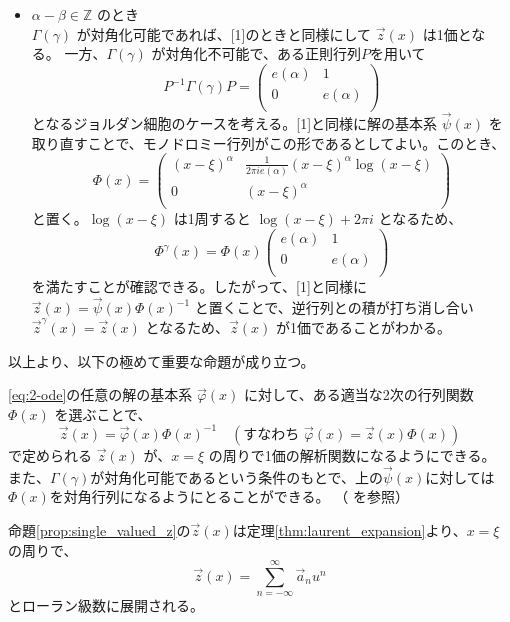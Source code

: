 \begin{itemize}
    \item[\textbf{[2]}] $\alpha-\beta \in \mathbb{Z}$ のとき\\
    $\Gamma(\gamma)$ が対角化可能であれば、[1]のときと同様にして $\vec{z}(x)$ は1価となる。
    一方、$\Gamma(\gamma)$ が対角化不可能で、ある正則行列$P$を用いて
    \[
    P^{-1}\Gamma(\gamma)P=
    \begin{pmatrix}
        e(\alpha) & 1 \\
        0 & e(\alpha) \\
    \end{pmatrix}
    \]
    となるジョルダン細胞のケースを考える。[1]と同様に解の基本系 $\vec{\psi}(x)$ を取り直すことで、モノドロミー行列がこの形であるとしてよい。このとき、
    \[
    \Phi(x)=
    \begin{pmatrix}
        (x-\xi)^{\alpha} & \frac{1}{2\pi i e(\alpha)}(x-\xi)^{\alpha}\log(x-\xi) \\
        0 & (x-\xi)^{\alpha} \\
    \end{pmatrix}
    \]
    と置く。$\log(x-\xi)$ は1周すると $\log(x-\xi) + 2\pi i$ となるため、
    \[
    \Phi^{\gamma}(x)= \Phi(x)
    \begin{pmatrix}
        e(\alpha) & 1 \\
        0 & e(\alpha) \\
    \end{pmatrix}
    \]
    を満たすことが確認できる。したがって、[1]と同様に $\vec{z}(x)=\vec{\psi}(x)\Phi(x)^{-1}$ と置くことで、逆行列との積が打ち消し合い $\vec{z}^{\gamma}(x) = \vec{z}(x)$ となるため、$\vec{z}(x)$ が1価であることがわかる。
\end{itemize}

以上より、以下の極めて重要な命題が成り立つ。

\begin{proposition}\label{prop:single_valued_z}
    \eqref{eq:2-ode}の任意の解の基本系 $\vec{\varphi}(x)$ に対して、ある適当な2次の行列関数 $\Phi(x)$ を選ぶことで、
    \[
    \vec{z}(x)=\vec{\varphi}(x)\Phi(x)^{-1} \quad (\text{すなわち } \vec{\varphi}(x) = \vec{z}(x)\Phi(x))
    \]
    で定められる $\vec{z}(x)$ が、$x=\xi$ の周りで1価の解析関数になるようにできる。\\
    また、$\Gamma(\gamma)$が対角化可能であるという条件のもとで、上の$\vec{\psi}(x)$に対しては$\Phi(x)$を対角行列になるようにとることができる。
    （\cite[p.59 命題2.5]{book:okamoto} を参照）
\end{proposition}

命題\ref{prop:single_valued_z}の$\vec{z}(x)$は定理\ref{thm:laurent_expansion}より、$x=\xi$の周りで、
\begin{equation}\label{eq:power_series_z}
\vec{z}(x)=\sum_{n=-\infty}^{\infty}\vec{a}_{n}u^{n}
\end{equation}
とローラン級数に展開される。


